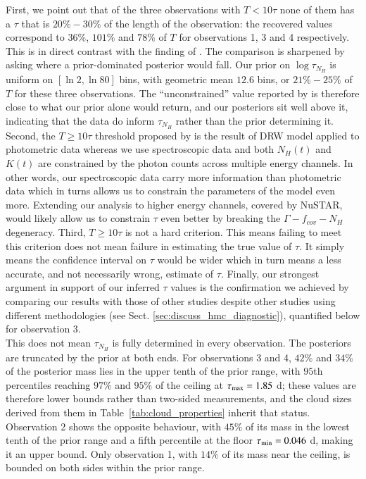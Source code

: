 \documentclass{aa}
\begin{document}
First, we point out that of the three observations with $T < 10\tau$ none of them has a $\tau$ that is $20\% - 30\%$ of the length of the observation: the recovered values correspond to $36\%$, $101\%$ and $78\%$ of $T$ for observations 1, 3 and 4 respectively. This is in direct contrast with the finding of \citet{Kozlowski2017}. The comparison is sharpened by asking where a prior-dominated posterior would fall. Our prior on $\log \tau_{N_H}$ is uniform on $[\ln 2, \ln 80]$ bins, with geometric mean $12.6$ bins, or $21\% - 25\%$ of $T$ for these three observations. The ``unconstrained'' value reported by \citet{Kozlowski2017} is therefore close to what our prior alone would return, and our posteriors sit well above it, indicating that the data do inform $\tau_{N_H}$ rather than the prior determining it. Second, the $T \ge 10 \tau$ threshold proposed by \citet{Kozlowski2017} is the result of DRW model applied to photometric data whereas we use spectroscopic data and both $N_H(t)$ and $K(t)$ are constrained by the photon counts across multiple energy channels. In other words, our spectroscopic data carry more information than photometric data which in turns allows us to constrain the parameters of the model even more. Extending our analysis to higher energy channels, covered by NuSTAR, would likely allow us to constrain $\tau$ even better by breaking the $\Gamma-f_{cov}-N_H$ degeneracy. Third, $T \ge 10 \tau$ is not a hard criterion. This means failing to meet this criterion does not mean failure in estimating the true value of $\tau$. It simply means the confidence interval on $\tau$ would be wider which in turn means a less accurate, and not necessarily wrong, estimate of $\tau$. Finally, our strongest argument in support of our inferred $\tau$ values is the confirmation we achieved by comparing our results with those of other studies despite other studies using different methodologies (see Sect. \ref{sec:discuss_hmc_diagnostic}), quantified below for observation 3. \\
This does not mean $\tau_{N_H}$ is fully determined in every observation. The posteriors are truncated by the prior at both ends. For observations 3 and 4, $42\%$ and $34\%$ of the posterior mass lies in the upper tenth of the prior range, with $95$th percentiles reaching $97\%$ and $95\%$ of the ceiling at $\tau_{\rm max} = 1.85$ d; these values are therefore lower bounds rather than two-sided measurements, and the cloud sizes derived from them in Table~\ref{tab:cloud_properties} inherit that status. Observation 2 shows the opposite behaviour, with $45\%$ of its mass in the lowest tenth of the prior range and a fifth percentile at the floor $\tau_{\rm min} = 0.046$ d, making it an upper bound. Only observation 1, with $14\%$ of its mass near the ceiling, is bounded on both sides within the prior range. \\
\end{document}
